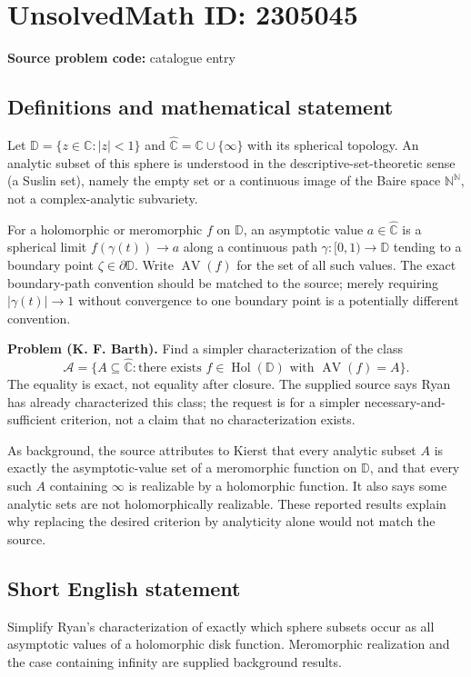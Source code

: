 \documentclass[11pt]{article}
\begin{document}
\section*{UnsolvedMath ID: 2305045}
\textbf{Source problem code:} catalogue entry
\subsection{Definitions and mathematical statement}
Let $\mathbb D=\{z\in\mathbb C:|z|<1\}$ and $\widehat{\mathbb C}=\mathbb C\cup\{\infty\}$ with its spherical topology. An analytic subset of this sphere is understood in the descriptive-set-theoretic sense (a Suslin set), namely the empty set or a continuous image of the Baire space $\mathbb N^{\mathbb N}$, not a complex-analytic subvariety.

For a holomorphic or meromorphic $f$ on $\mathbb D$, an asymptotic value $a\in\widehat{\mathbb C}$ is a spherical limit $f(\gamma(t))\to a$ along a continuous path $\gamma:[0,1)\to\mathbb D$ tending to a boundary point $\zeta\in\partial\mathbb D$. Write $\operatorname{AV}(f)$ for the set of all such values. The exact boundary-path convention should be matched to the source; merely requiring $|\gamma(t)|\to1$ without convergence to one boundary point is a potentially different convention.

\textbf{Problem (K. F. Barth).} Find a simpler characterization of the class
\[
\mathcal A=\{A\subseteq\widehat{\mathbb C}:\text{there exists }f\in\operatorname{Hol}(\mathbb D)
\text{ with }\operatorname{AV}(f)=A\}.
\]
The equality is exact, not equality after closure. The supplied source says Ryan has already characterized this class; the request is for a simpler necessary-and-sufficient criterion, not a claim that no characterization exists.

As background, the source attributes to Kierst that every analytic subset $A$ is exactly the asymptotic-value set of a meromorphic function on $\mathbb D$, and that every such $A$ containing $\infty$ is realizable by a holomorphic function. It also says some analytic sets are not holomorphically realizable. These reported results explain why replacing the desired criterion by analyticity alone would not match the source.
\subsection{Short English statement}
Simplify Ryan's characterization of exactly which sphere subsets occur as all asymptotic values of a holomorphic disk function. Meromorphic realization and the case containing infinity are supplied background results.
\end{document}
